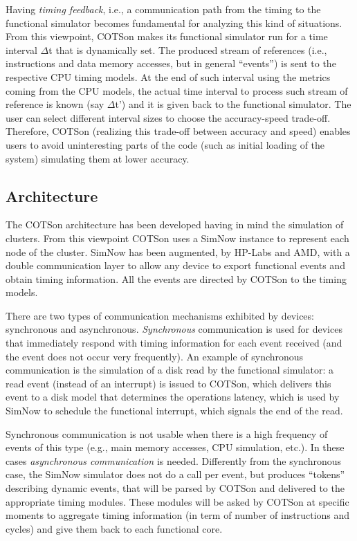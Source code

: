 \documentclass[a4paper]{article}
\begin{document}
{
Having \textit{timing feedback}, i.e., a communication path from the
timing to the functional simulator becomes fundamental for analyzing
this kind of situations. From this viewpoint, COTSon makes its
functional simulator run for a time interval ${\Delta}$t that is
dynamically set. The produced stream of references (i.e., instructions
and data memory accesses, but in general
{\textquotedblleft}events{\textquotedblright}) is sent to the
respective CPU timing models. At the end of such interval using the
metrics coming from the CPU models, the actual time interval to process
such stream of reference is known (say ${\Delta}$t{\textquoteright})
and it is given back to the functional simulator. The user can select
different interval sizes to choose the accuracy-speed trade-off.
Therefore, COTSon (realizing this trade-off between accuracy and speed)
enables users to avoid uninteresting parts of the code (such as initial
loading of the system) simulating them at lower accuracy.}

\subsection[Architecture]{Architecture}
{
The COTSon architecture has been developed having in mind the simulation
of clusters. From this viewpoint COTSon uses a SimNow instance to
represent each node of the cluster. SimNow has been augmented, by
HP-Labs and AMD, with a double communication layer to allow any device
to export functional events and obtain timing information. All the
events are directed by COTSon to the timing models. }

{
There are two types of communication mechanisms exhibited by devices:
synchronous and asynchronous. \textit{Synchronous }communication is
used for devices that immediately respond with timing information for
each event received (and the event does not occur very frequently). An
example of synchronous communication is the simulation of a disk read
by the functional simulator: a read event (instead of an interrupt) is
issued to COTSon, which delivers this event to a disk model that
determines the operation{\textquotesingle}s latency, which is used by
SimNow to schedule the functional interrupt, which signals the end of
the read. }

{
Synchronous communication is not usable when there is a high frequency
of events of this type (e.g., main memory accesses, CPU simulation,
etc.). In these cases \textit{asynchronous communication} is needed.
Differently from the synchronous case, the SimNow simulator does not do
a call per event, but produces
{\textquotedblleft}tokens{\textquotedblright} describing dynamic
events, that will be parsed by COTSon and delivered to the appropriate
timing modules. These modules will be asked by COTSon at specific
moments to aggregate timing information (in term of number of
instructions and cycles) and give them back to each functional core. }
\end{document}
